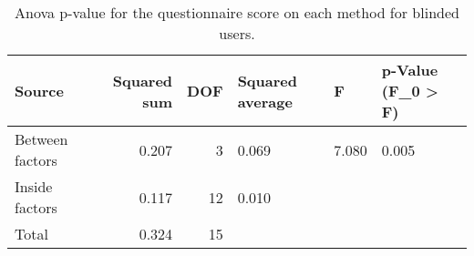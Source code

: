 
\begin{table}[!htb]
\centering
\caption{Anova p-value for the questionnaire score on each method for blinded users.}
\label{tab:anova_questionnaire}
\begin{tabular}{lrrlll}
\toprule
         Source &  Squared sum &  DOF & Squared average &     F & p-Value (F\_0 > F) \\
\midrule
Between factors &        0.207 &    3 &           0.069 & 7.080 &             0.005 \\
 Inside factors &        0.117 &   12 &           0.010 &       &                   \\
          Total &        0.324 &   15 &                 &       &                   \\
\bottomrule
\end{tabular}
\end{table}

